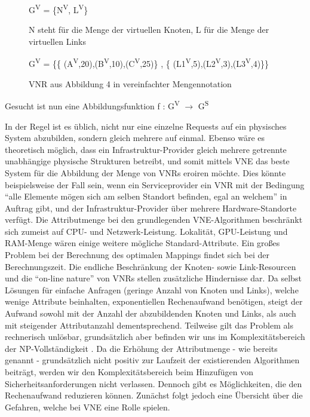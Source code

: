 \documentclass{lni}
\begin{document}
\begin{figure}[htb]
\begin{center}
G\textsuperscript{V} = \{N\textsuperscript{V}, L\textsuperscript{V}\}
\caption{\label{graph5}N steht für die Menge der virtuellen Knoten, L für die Menge der virtuellen Links}
\end{center}
\end{figure}

\begin{figure}[htb]
\begin{center}
G\textsuperscript{V} = \{\{
(A\textsuperscript{V},20),(B\textsuperscript{V},10),(C\textsuperscript{V},25)\} , \{
(L1\textsuperscript{V},5),(L2\textsuperscript{V},3),(L3\textsuperscript{V},4)\}\}
\caption{\label{graph6}VNR aus Abbildung 4 in vereinfachter Mengennotation}
\end{center}
\end{figure}


Gesucht ist nun eine Abbildungsfunktion f : G\textsuperscript{V} $\rightarrow$ G\textsuperscript{S}


In der Regel ist es üblich, nicht nur eine einzelne Requests auf ein physisches System abzubilden, sondern gleich mehrere auf einmal. Ebenso wäre es theoretisch möglich, dass ein Infrastruktur-Provider gleich mehrere getrennte unabhängige physische Strukturen betreibt, und somit mittels VNE das beste System für die Abbildung der Menge von VNRs eroiren möchte. Dies könnte beispielsweise der Fall sein, wenn ein Serviceprovider ein VNR mit der Bedingung "`alle Elemente mögen sich am selben Standort befinden, egal an welchem"' in Auftrag gibt, und der Infrastruktur-Provider über mehrere Hardware-Standorte verfügt.
\newline
Die Attributmenge bei den grundlegenden VNE-Algorithmen beschränkt  sich zumeist auf CPU- und Netzwerk-Leistung. 
Lokalität, GPU-Leistung und RAM-Menge wären einige weitere mögliche Standard-Attribute. Ein großes Problem bei der Berechnung des optimalen Mappings findet sich bei der Berechnungszeit. Die endliche Beschränkung der Knoten- sowie Link-Resourcen und die "`on-line nature"' von VNRs stellen zusätzliche Hindernisse dar. Da selbst Lösungen für einfache Anfragen (geringe Anzahl von Knoten und Links), welche wenige Attribute beinhalten, exponentiellen Rechenaufwand benötigen, steigt der Aufwand sowohl mit der Anzahl der abzubildenden Knoten und Links, als auch mit steigender Attributanzahl dementsprechend. Teilweise gilt das Problem als rechnerisch unlösbar, grundsätzlich aber befinden wir uns im Komplexitätsbereich der NP-Vollständigkeit \cite{SVNE2}. Da die Erhöhung der Attributmenge - wie bereits genannt - grundsätzlich nicht positiv zur Laufzeit der existierenden Algorithmen beiträgt, werden wir den Komplexitätsbereich beim Hinzufügen von Sicherheitsanforderungen nicht verlassen. Dennoch gibt es Möglichkeiten, die den Rechenaufwand reduzieren können. Zunächst folgt jedoch eine Übersicht über die Gefahren, welche bei VNE eine Rolle spielen.
\end{document}
